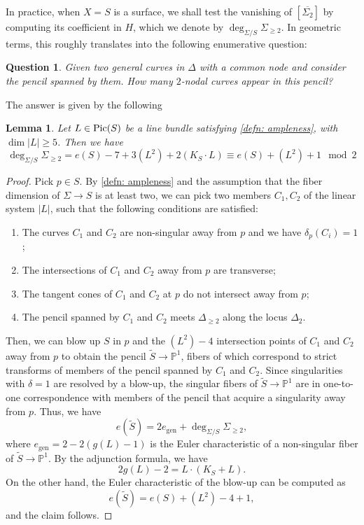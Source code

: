 \documentclass[11pt]{amsart}
\theoremstyle{plain}
\newtheorem{lem}[thm]{Lemma}
\newtheorem{question}[thm]{Question}
\theoremstyle{definition}
\theoremstyle{remark}
\newcommand{\Pic}{\mathop{\rm Pic}\nolimits}
\begin{document}
In practice, when $X=S$ is a {surface}, we shall test the vanishing of $[\overline{\Sigma_{2}}]$ by computing its coefficient in $H$, which we denote by $\deg_{\Sigma/S} \Sigma_{\geq 2}$. In geometric terms, this roughly translates into the following enumerative question:

\begin{question}
    Given two general curves in $\Delta$ with a common node and consider the pencil spanned by them. How many $2$-nodal curves appear in this pencil?
\end{question}

The answer is given by the following

\begin{lem}\label{lemma: relative degree}
    Let $L \in \Pic(S)$ be a line bundle satisfying \ref{defn: ampleness}, with $\dim |L| \geq 5$. Then we have
    $$\deg_{\Sigma/S} \Sigma_{\geq 2} = e(S) - 7 + 3 (L^2) + 2 (K_S \cdot L) \equiv e(S) + (L^2) + 1 \mod 2$$
\end{lem}

\begin{proof}
Pick $p \in S$. By \ref{defn: ampleness} and the assumption that the fiber dimension of $\Sigma \to S$ is at least two, we can pick two members $C_1, C_2$ of the linear system $|L|$, such that the following conditions are satisfied: 
\begin{enumerate}
\item The curves $C_1$ and $C_2$ are non-singular away from $p$ and we have $\delta_p(C_i) = 1$;
\item The intersections of $C_1$ and $C_2$ away from $p$ are transverse;
\item The tangent cones of $C_1$ and $C_2$ at $p$ do not intersect away from $p$;
\item The pencil spanned by $C_1$ and $C_2$ meets $\Delta_{\geq 2}$ along the locus $\Delta_{2}$.
\end{enumerate}
Then, we can blow up $S$ in $p$ and the $(L^2)-4$ intersection points of $C_1$ and $C_2$ away from $p$ to obtain the pencil $\widetilde{S} \to \mathbb P^1$, fibers of which correspond to strict transforms of members of the pencil spanned by $C_1$ and $C_2$. Since singularities with $\delta = 1$ are resolved by a blow-up, the singular fibers of $\widetilde{S} \to \mathbb P^1$ are in one-to-one correspondence with members of the pencil that acquire a singularity away from $p$.
Thus, we have 
$$e(\widetilde{S}) = 2e_{\mathrm{gen}} + \deg_{\Sigma/S} \Sigma_{\geq 2},$$
where $e_{\mathrm{gen}} = 2 - 2(g(L) - 1)$ is the Euler characteristic of a non-singular fiber of $\widetilde{S} \to \mathbb P^1$. By the adjunction formula, we have
\[
2 g(L) - 2 = L\cdot (K_S + L).
\]
On the other hand, the Euler characteristic of the blow-up can be computed as $$e(\widetilde{S}) = e(S) + (L^2) - 4 + 1,$$ and the claim follows.
\end{proof}
\end{document}
